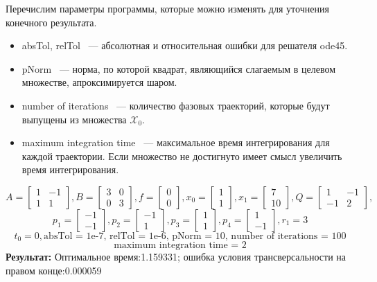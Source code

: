 \documentclass[10pt]{article}
\begin{document}
Перечислим параметры программы, которые можно изменять для уточнения конечного результата. 
\begin{itemize}
	\item absTol, relTol ~--- абсолютная и относительная ошибки для решателя ode45.
	\item pNorm ~--- норма, по которой квадрат, являющийся слагаемым в целевом множестве, апроксимируется шаром.
	\item number of iterations ~--- количество фазовых траекторий, которые будут выпущены из множества \( \mathcal{X}_0 \). 
	\item maximum integration time ~--- максимальное время интегрирования для каждой траектории. Если множество не достигнуто имеет смысл увеличить время интегрирования.
\end{itemize}
\newpage
{}
\[ A = \begin{bmatrix}
      		1 & -1 \\[0.3em]
      		1 & 1
      	  \end{bmatrix} , 
 B = \begin{bmatrix}
      	   3 & 0 \\[0.3em]
      	   0 & 3
      \end{bmatrix} ,
 f = \begin{bmatrix}
       	    0 \\[0.3em]
      	    0
      \end{bmatrix} ,
 x_0 = \begin{bmatrix}
      	    1 \\[0.3em]
      	    1
      \end{bmatrix} ,
 x_1 = \begin{bmatrix}
      	7 \\[0.3em]
      	10
      \end{bmatrix} ,
 Q = \begin{bmatrix}
      	   1 & -1 \\[0.3em]
      	   -1 & 2
      \end{bmatrix}, \]
\[ p_1 = \begin{bmatrix}
      	-1 \\[0.3em]
      	-1
      \end{bmatrix} ,
p_2 = \begin{bmatrix}
      	-1 \\[0.3em]
      	1
      \end{bmatrix} ,
p_3 = \begin{bmatrix}
      	1 \\[0.3em]
      	1
      \end{bmatrix} ,
p_4 = \begin{bmatrix}
      	1 \\[0.3em]
      	-1
      \end{bmatrix}, r_1 = 3 \]
\[ t_0 = 0, \text{absTol = 1e-7, relTol = 1e-6, pNorm = 10, number of iterations = 100}\]  
\[\text{maximum integration time = 2} \]
\textbf{Результат:} Оптимальное время:1.159331; ошибка условия трансверсальности на правом конце:0.000059 
\end{document}
